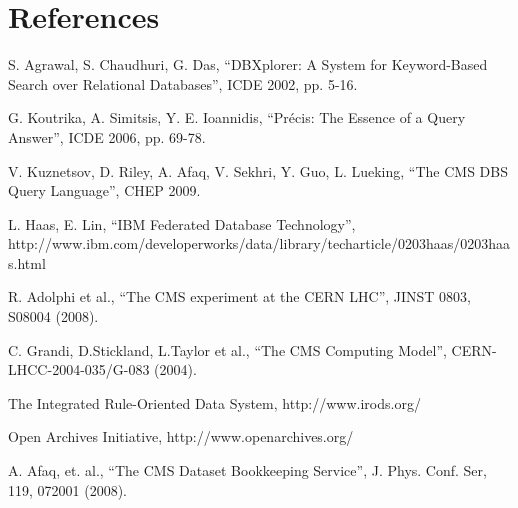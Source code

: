 \documentclass[1p,times]{elsarticle}
\begin{document}






\section*{References}
\begin{thebibliography}{00}
S. Agrawal, S. Chaudhuri, G. Das,
``DBXplorer: A System for Keyword-Based Search over Relational Databases'',
ICDE 2002, pp. 5-16.

G. Koutrika, A. Simitsis, Y. E. Ioannidis,
``Pr\'{e}cis: The Essence of a Query Answer'',
ICDE 2006, pp. 69-78.

V. Kuznetsov, D. Riley, A. Afaq, V. Sekhri, Y. Guo, L. Lueking,
``The CMS DBS Query Language'', CHEP 2009.


L. Haas, E. Lin,
``IBM Federated Database Technology'', \\
http://www.ibm.com/developerworks/data/library/techarticle/0203haas/0203haas.html

R. Adolphi et al., 
``The CMS experiment at the CERN LHC'',
JINST 0803, S08004 (2008).

C. Grandi, D.Stickland, L.Taylor et al.,
``The CMS Computing Model'',
CERN-LHCC-2004-035/G-083 (2004).

The Integrated Rule-Oriented Data System,
http://www.irods.org/

Open Archives Initiative,
http://www.openarchives.org/

A. Afaq, et. al.,
``The CMS Dataset Bookkeeping Service'', 
J. Phys. Conf. Ser, 119, 072001 (2008).


\end{thebibliography}
\end{document}
